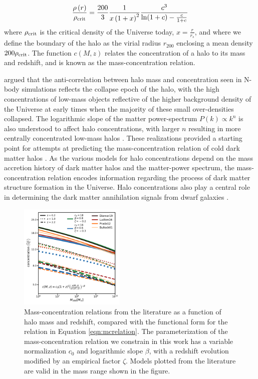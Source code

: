 \begin{equation}
\frac{\rho \left(r\right)}{\rho_{\rm{crit}}} = \frac{200}{3} \frac{1}{x \left(1+x\right)^2} \frac{c^3}{\ln(1+c)  - \frac{c}{1+c}}
\end{equation}
where $\rho_{\rm{crit}}$ is the critical density of the Universe today, $x = \frac{r}{r_s}$, and where we define the boundary of the halo as the virial radius $r_{200}$ enclosing a mean density $200 \rho_{\rm{crit}}$. The function $c \left(M, z\right)$ relates the concentration of a halo to its mass and redshift, and is known as the mass-concentration relation.

\cite{Navarro++97} argued that the anti-correlation between halo mass and concentration seen in N-body simulations reflects the collapse epoch of the halo, with the high concentrations of low-mass objects reflective of the higher background density of the Universe at early times when the majority of these small over-densities collapsed. The logarithmic slope of the matter power-spectrum $P\left(k\right) \propto k^{n}$ is also understood to affect halo concentrations, with larger $n$ resulting in more centrally concentrated low-mass halos \cite{Eke++01}. These realizations provided a starting point for attempts at predicting the mass-concentration relation of cold dark matter halos \cite{Bullock++01,Wechsler++02,Prada++12,vandenBosch++14,Ludlow++14,DiemerJoyce19}. As the various models for halo concentrations depend on the mass accretion history of dark matter halos and the matter-power spectrum, the mass-concentration relation encodes information regarding the process of dark matter structure formation in the Universe. Halo concentrations also play a central role in determining the dark matter annihilation signals from dwarf galaxies \cite{Strigari++07}. 

\begin{figure}
	\centering
	\includegraphics[clip,trim=0cm 0cm 0cm
	0cm,width=0.45\textwidth,keepaspectratio]{./figures_mcrelation/mc_relations.pdf}
	\caption{\label{fig:mcrelations} Mass-concentration relations from the literature as a function of halo mass and redshift, compared with the functional form for the relation in Equation \ref{eqn:mcrelation}. The parameterization of the mass-concentration relation we constrain in this work has a variable normalization $c_0$ and logarithmic slope $\beta$, with a redshift evolution modified by an empirical factor $\zeta$. Models plotted from the literature are valid in the mass range shown in the figure.}
\end{figure}	


